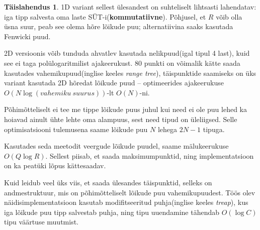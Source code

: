\documentclass{trkut}
\theoremstyle{definition}
\newtheorem*{solution}{Täislahendus}
\begin{document}
\begin{solution}
1D variant sellest ülesandest on suhteliselt lihtsasti lahendatav: iga tipp salvesta oma laste SÜT-i(\textbf{kommutatiivne}). Põhjusel, et $R$ võib olla üsna suur, peab see olema hõre lõikude puu; alternatiivina saaks kasutada Fenwicki puud.

2D versioonis võib tunduda ahvatlev kasutada nelikpuud(igal tipul 4 last), kuid see ei taga polülogaritmilist ajakeerukust. 
80 punkti on võimalik kätte saada kasutades vahemikupuud(inglise keeles \textit{range tree}), täispunktide saamiseks on üks variant kasutada 2D hõredat lõikude puud -- optimeerides ajakeerukuse $O(N\log (vahemiku\ suurus))$-lt $O(N)$-ni.

Põhimõtteliselt ei tee me tippe lõikude puus juhul kui need ei ole puu lehed ka hoiavad ainult ühte lehte oma alampuus, sest need tipud on üleliigsed. Selle optimisatsiooni tulemusena saame lõikude puu $N$ lehega $2N-1$ tipuga.

Kasutades seda meetodit veergude lõikude puudel, saame mälukeerukuse $O(Q\log R)$.
Sellest piisab, et saada maksimumpunktid, ning implementatsioon on ka peatüki lõpus kättesaadav.

Kuid leidub veel üks viis, et saada ülesandes täispunktid, selleks on andmestruktuur, mis on põhimõtteliselt lõikude puu vahemikupuudest.
Töös olev näidisimplementatsioon kasutab modifitseeritud puhja(inglise keeles \textit{treap}), kus iga lõikude puu tipp salvestab puhja, ning tipu uuendamine tähendab $O(\log C)$ tipu väärtuse muutmist.

\parencite{IOIS1}\parencite{IOIS2}
\end{solution}
\end{document}
